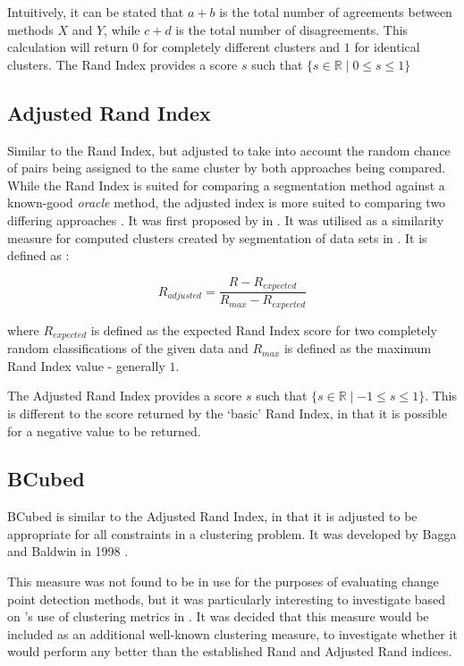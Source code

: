 \documentclass[../main.tex]{subfiles}
\begin{document}
	Intuitively, it can be stated that $a+b$ is the total number of agreements between methods $X$ and $Y$, while $c+d$ is the total number of disagreements. This calculation will return $0$ for completely different clusters and $1$ for identical clusters. The Rand Index provides a score $s$ such that $ \{s\in\mathbb{R} \mid 0\leq s \leq 1\} $
	
\subsection{Adjusted Rand Index}
	
Similar to the Rand Index, but adjusted to take into account the random chance of pairs being assigned to the same cluster by both approaches being compared. While the Rand Index is suited for comparing a segmentation method against a known-good \emph{oracle} method, the adjusted index is more suited to comparing two differing approaches \cite{Matteson2012}. It was first proposed by \citeauthor{Hubert1985} in . It was utilised as a similarity measure for computed clusters created by segmentation of data sets in \cite{Matteson2012}. It is defined as \cite{Hubert1985}:
	
	\begin{equation}
	    R_{adjusted} = \frac{R - R_{expected}}{R_{max} - R_{expected}}
	\end{equation}
	
	where $R_{expected}$ is defined as the expected Rand Index score for two completely random classifications of the given data \cite{Matteson2012} and $R_{max}$ is defined as the maximum Rand Index value - generally $1$.
	
	The Adjusted Rand Index provides a score $s$ such that $ \{s\in\mathbb{R} \mid -1\leq s \leq 1\} $. This is different to the score returned by the `basic' Rand Index, in that it is possible for a negative value to be returned.
		
\subsection{BCubed}
		
BCubed is similar to the Adjusted Rand Index, in that it is adjusted to be appropriate for all constraints in a clustering problem. It was developed by Bagga and Baldwin in 1998 \cite{Bagga1998}.

This measure was not found to be in use for the purposes of evaluating change point detection methods, but it was particularly interesting to investigate based on \citeauthor{Matteson2012}'s use of clustering metrics in \cite{Matteson2012}. It was decided that this measure would be included as an additional well-known clustering measure, to investigate whether it would perform any better than the established Rand and Adjusted Rand indices.
	
\end{document}
